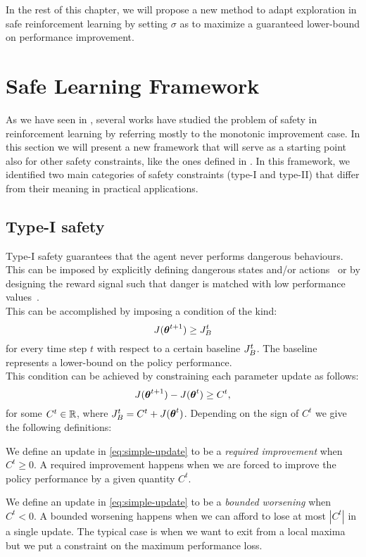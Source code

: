In the rest of this chapter, we will propose a new method to adapt exploration in safe reinforcement learning by setting $\sigma$ as to maximize a guaranteed lower-bound on performance improvement.


\section{Safe Learning Framework}\label{sec:framework}

As we have seen in , several works have studied the problem of safety in reinforcement learning by referring mostly to the monotonic improvement case. In this section we will present a new framework that will serve as a starting point also for other safety constraints, like the ones defined in . In this framework, we identified two main categories of safety constraints (type-I and type-II) that differ from their meaning in practical applications. 

\subsection{Type-I safety} 
Type-I safety guarantees that the agent never performs dangerous behaviours. This can be imposed by explicitly defining dangerous states and/or actions~\cite{gehring2013smart} or by designing the reward signal such that danger is matched with low performance values~\cite{safe_iteration}\cite{trpo}\cite{Petrik:2016:SPI:3157096.3157354}.\\
This can be accomplished by imposing a condition of the kind:%
%
\begin{equation}
J(\vtheta^{t+1}) \geq \jbase
\end{equation}
for every time step $t$ with respect to a certain baseline $\jbase$. The baseline represents a lower-bound on the policy performance.\\
This condition can be achieved by constraining each parameter update as follows:
\begin{equation}\label{eq:simple-update}
J(\vtheta^{t+1}) - J(\vtheta^{t}) \geq C^t,
\end{equation}
for some $C^t\in \realspace$, where $\jbase[t]=C^t + J(\vtheta^t)$. Depending on the sign of $C^t$ we give the following definitions:
\begin{definition}\label{def:required-improvement}
We define an update in \ref{eq:simple-update} to be a \textit{required improvement} when $C^t \geq 0$. A required improvement happens when we are forced to improve the policy performance by a given quantity $C^t$.
\end{definition}
\begin{definition}\label{def:bounded-worsening}
We define an update in \ref{eq:simple-update} to be a \textit{bounded worsening} when $C^t < 0$. A bounded worsening happens when we can afford to lose at most $|C^t|$ in a single update. The typical case is when we want to exit from a local maxima but we put a constraint on the maximum performance loss.
\end{definition}


